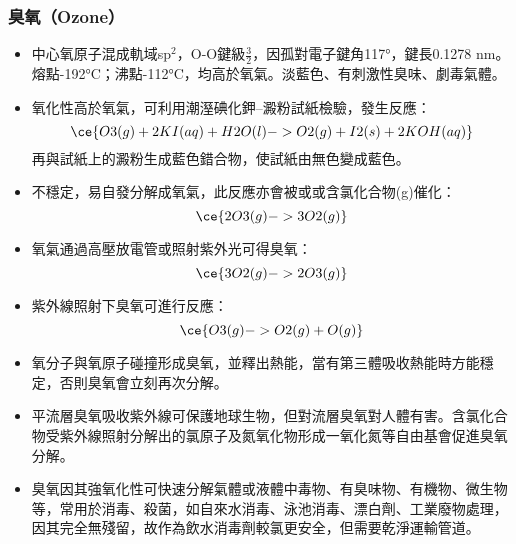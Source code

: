 \documentclass[a4paper,12pt]{report}
\begin{document}
\subsubsection{臭氧（Ozone）}
\begin{itemize}
\item 中心氧原子混成軌域sp$^2$，O-O鍵級$\frac{3}{2}$，因孤對電子鍵角117°，鍵長0.1278 nm。熔點-192°C；沸點-112°C，均高於氧氣。淡藍色、有刺激性臭味、劇毒氣體。
\item 氧化性高於氧氣，可利用潮溼碘化鉀–澱粉試紙檢驗，發生反應：
\[\ce{O3(g) + 2KI(aq) + H2O(l) -> O2(g) + I2(s) + 2KOH(aq)}\]
再與試紙上的澱粉生成藍色錯合物，使試紙由無色變成藍色。
\item 不穩定，易自發分解成氧氣，此反應亦會被或或含氯化合物(g)催化：
\[\ce{2O3(g) -> 3O2(g)}\]
\item 氧氣通過高壓放電管或照射紫外光可得臭氧：
\[\ce{3O2(g) -> 2O3(g)}\]
\item 紫外線照射下臭氧可進行反應：
\[\ce{O3(g) -> O2(g) + O(g)}\]
\item 氧分子與氧原子碰撞形成臭氧，並釋出熱能，當有第三體吸收熱能時方能穩定，否則臭氧會立刻再次分解。
\item 平流層臭氧吸收紫外線可保護地球生物，但對流層臭氧對人體有害。含氯化合物受紫外線照射分解出的氯原子及氮氧化物形成一氧化氮等自由基會促進臭氧分解。
\item 臭氧因其強氧化性可快速分解氣體或液體中毒物、有臭味物、有機物、微生物等，常用於消毒、殺菌，如自來水消毒、泳池消毒、漂白劑、工業廢物處理，因其完全無殘留，故作為飲水消毒劑較氯更安全，但需要乾淨運輸管道。
\end{itemize}
\end{document}
